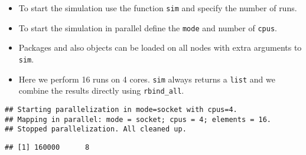 \begin{itemize}
\itemsep1pt\parskip0pt
\item
  To start the simulation use the function \texttt{sim} and specify the
  number of runs.
\item
  To start the simulation in parallel define the \texttt{mode} and
  number of \texttt{cpus}.
\item
  Packages and also objects can be loaded on all nodes with extra
  arguments to \texttt{sim}.
\item
  Here we perform 16 runs on 4 cores. \texttt{sim} always returns a
  \texttt{list} and we combine the results directly using
  \texttt{rbind\_all}.
\end{itemize}

\begin{Shaded}
\end{Shaded}

\begin{verbatim}
## Starting parallelization in mode=socket with cpus=4.
## Mapping in parallel: mode = socket; cpus = 4; elements = 16.
## Stopped parallelization. All cleaned up.
\end{verbatim}

\begin{verbatim}
## [1] 160000      8
\end{verbatim}
